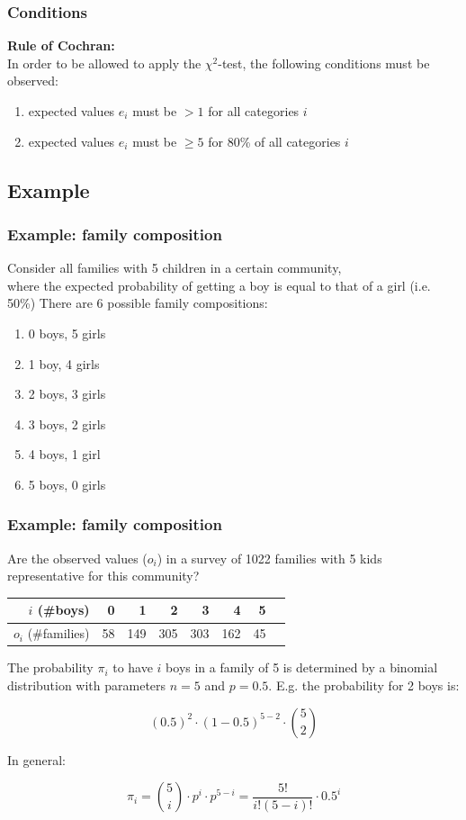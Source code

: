 \documentclass{beamer}
\begin{document}
\begin{frame}
\frametitle{Conditions}
\textbf{Rule of Cochran:}\\
In order to be allowed to apply the $\chi^2$-test, the following conditions must be observed: 
\begin{enumerate}
    \item expected values $e_i$ must be $>1$ for all categories $i$
    \item expected values $e_i$ must be $\ge5$ for 80\% of all categories $i$
\end{enumerate}
\end{frame}

\subsection{Example}

\begin{frame}
  \frametitle{Example: family composition}
  
  Consider all families with 5 children in a certain community,\\
  where the expected probability of getting a boy is equal to that of a girl (i.e. 50\%)
  \vfill
  \pause
  There are 6 possible family compositions:
  \begin{enumerate}
    \item 0 boys, 5 girls
    \item 1 boy, 4 girls
    \item 2 boys, 3 girls
    \item 3 boys, 2 girls
    \item 4 boys, 1 girl
    \item 5 boys, 0 girls
  \end{enumerate}

\end{frame}

\begin{frame}
  \frametitle{Example: family composition}
  Are the observed values ($o_i$) in a survey of 1022 families with 5 kids representative for this community?
  \begin{table}[h]
\begin{tabular}{@{}rrrrrrrr@{}}
\toprule
$i$ (\#boys)         & 0  & 1   & 2   & 3   & 4   & 5  &  \\ \midrule
$o_{i}$ (\#families) & 58 & 149 & 305 & 303 & 162 & 45 &  \\ \bottomrule
\end{tabular}
\end{table}
\pause
The probability $\pi_{i}$ to have $i$ boys in a family of 5 is determined by a binomial distribution with parameters $n=5$ and $p=0.5$. E.g. the probability for 2 boys is:

\[ (0.5)^{2} \cdot (1-0.5)^{5-2} \cdot \binom{5}{2} \]

In general:

\[ \pi_{i} = \binom{5}{i}\cdot p^{i} \cdot p^{5-i} = \frac{5!}{i!(5-i)!}\cdot 0.5^{i} \]
\end{frame}
\end{document}
